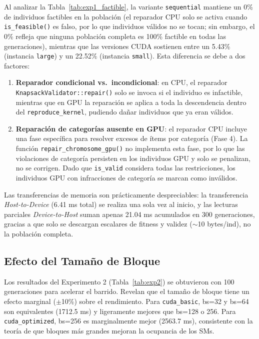 Al analizar la Tabla~\ref{tab:exp1_factible}, la variante \texttt{sequential} mantiene un 0\% de individuos factibles en la población (el reparador CPU solo se activa cuando \texttt{is\_feasible()} es falso, por lo que individuos válidos no se tocan; sin embargo, el 0\% refleja que ninguna población completa es 100\% factible en todas las generaciones), mientras que las versiones CUDA sostienen entre un 5.43\% (instancia \texttt{large}) y un 22.52\% (instancia \texttt{small}). Esta diferencia se debe a dos factores:

\begin{enumerate}
  \item \textbf{Reparador condicional vs.\ incondicional}: en CPU, el reparador
    \texttt{KnapsackValidator::repair()} solo se invoca si el individuo es
    infactible, mientras que en GPU la reparación se aplica a toda la descendencia
    dentro del \texttt{reproduce\_kernel}, pudiendo dañar individuos que ya eran
    válidos.
  \item \textbf{Reparación de categorías ausente en GPU}: el reparador CPU incluye
    una fase específica para resolver excesos de ítems por categoría (Fase 4). La
    función \texttt{repair\_chromosome\_gpu()} no implementa esta fase, por lo que
    las violaciones de categoría persisten en los individuos GPU y solo se
    penalizan, no se corrigen. Dado que \texttt{is\_valid} considera todas las
    restricciones, los individuos GPU con infracciones de categoría se marcan
    como inválidos.
\end{enumerate}

Las transferencias de memoria son prácticamente despreciables: la transferencia \emph{Host-to-Device} (6.41 ms total) se realiza una sola vez al inicio, y las lecturas parciales \emph{Device-to-Host} suman apenas 21.04 ms acumulados en 300 generaciones, gracias a que solo se descargan escalares de fitness y validez ($\sim$10 bytes/ind), no la población completa.

\subsection{Efecto del Tamaño de Bloque}

Los resultados del Experimento 2 (Tabla~\ref{tab:exp2}) se obtuvieron con 100 generaciones para acelerar el barrido. Revelan que el tamaño de bloque tiene un efecto marginal ($\pm$10\%) sobre el rendimiento. Para \texttt{cuda\_basic}, bs=32 y bs=64 son equivalentes (1712.5 ms) y ligeramente mejores que bs=128 o 256. Para \texttt{cuda\_optimized}, bs=256 es marginalmente mejor (2563.7 ms), consistente con la teoría de que bloques más grandes mejoran la ocupancia de los SMs.

